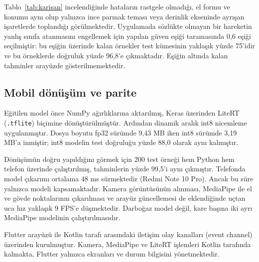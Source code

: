 Tablo~\ref{tab:karisan} incelendiğinde hataların rastgele olmadığı, el formu ve
konumu aynı olup yalnızca ince parmak teması veya derinlik ekseninde ayrışan
işaretlerde toplandığı görülmektedir. Uygulamada sözlükte olmayan bir hareketin
yanlış sınıfa atanmasını engellemek için yapılan güven eşiği taramasında 0,6
eşiği seçilmiştir: bu eşiğin üzerinde kalan örnekler test kümesinin yaklaşık
yüzde 75'idir ve bu örneklerde doğruluk yüzde 96,8'e çıkmaktadır. Eşiğin altında
kalan tahminler arayüzde gösterilmemektedir.

\subsection{Mobil dönüşüm ve parite}

Eğitilen model önce NumPy ağırlıklarına aktarılmış, Keras üzerinden LiteRT
(\texttt{.tflite}) biçimine dönüştürülmüştür. Ardından dinamik aralık int8
nicemleme uygulanmıştır. Dosya boyutu fp32 sürümde 9,43 MB iken int8 sürümde
3,19 MB'a inmiştir; int8 modelin test doğruluğu yüzde 88,0 olarak aynı kalmıştır.

Dönüşümün doğru yapıldığını görmek için 200 test örneği hem Python hem telefon
üzerinde çalıştırılmış, tahminlerin yüzde 99,5'i aynı çıkmıştır. Telefonda model
çıkarımı ortalama 48 ms sürmektedir (Redmi Note 10 Pro). Ancak bu süre yalnızca
modeli kapsamaktadır. Kamera görüntüsünün alınması, MediaPipe ile el ve gövde
noktalarının çıkarılması ve arayüz güncellemesi de eklendiğinde uçtan uca hız
yaklaşık 9 FPS'e düşmektedir. Darboğaz model değil, kare başına iki ayrı MediaPipe
modelinin çalıştırılmasıdır.

Flutter arayüzü ile Kotlin tarafı arasındaki iletişim olay kanalları (event
channel) üzerinden kurulmuştur. Kamera, MediaPipe ve LiteRT işlemleri Kotlin
tarafında kalmakta, Flutter yalnızca ekranları ve durum bilgisini yönetmektedir.
